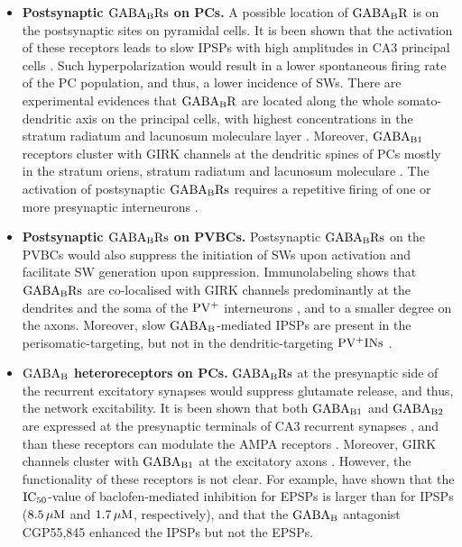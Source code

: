     \begin{itemize}
      \item \textbf{Postsynaptic $\rm GABA_BRs$ on PCs.}
        A possible location of $\rm GABA_BR$ is on the postsynaptic sites on
        pyramidal cells. It is been shown that the activation of these
        receptors leads to slow IPSPs with high amplitudes in CA3 principal
        cells \citep{Knowles1984}. Such hyperpolarization would result in a
        lower spontaneous firing rate of the PC population, and thus, a lower
        incidence of SWs. There are experimental evidences that $\rm GABA_BR$
        are located along the whole somato-dendritic axis on the principal
        cells, with highest concentrations in the stratum radiatum and
        lacunosum moleculare layer \citep{Degro2015}. Moreover, $\rm GABA_{B1}$
        receptors cluster with GIRK channels at the dendritic spines of PCs
        mostly in the stratum oriens, stratum radiatum and lacunosum moleculare
        \citep{Kulik2006}. The activation of postsynaptic $\rm GABA_BRs$
        requires a repetitive firing of one or more presynaptic interneurons
        \citep{Scanziani2000}.

      \item \textbf{Postsynaptic $\rm GABA_BRs$ on PVBCs.}
        Postsynaptic $\rm GABA_BRs$ on the PVBCs would also suppress the
        initiation of SWs upon activation and facilitate SW generation upon
        suppression. Immunolabeling shows that $\rm GABA_BRs$ are co-localised
        with GIRK channels predominantly at the dendrites and the soma of the
        $\rm PV^+$ interneurons \citep{Booker2013}, and to a smaller degree on
        the axons. Moreover, slow $\rm GABA_B$-mediated IPSPs are present in
        the perisomatic-targeting, but not in the dendritic-targeting $\rm
        PV^+INs$ \citep{Booker2013}.

      \item \textbf{$\rm GABA_B$ heteroreceptors on PCs.}
        $\rm GABA_BRs$ at the presynaptic side of the recurrent excitatory
        synapses would suppress glutamate release, and thus, the network
        excitability. It is been shown that both $\rm GABA_{B1}$ and $\rm
        GABA_{B2}$ are expressed at the presynaptic terminals of CA3 recurrent
        synapses \citep{Lopez2004}, and than these receptors can modulate the
        AMPA receptors \citep{Lei2003}. Moreover, GIRK channels cluster with
        $\rm GABA_{B1}$ at the excitatory axons \citep{Kulik2006}. However, the
        functionality of these receptors is not clear. For example,
        \cite{Lei2003} have shown that the $\rm IC_{50}$-value of
        baclofen-mediated inhibition for EPSPs is larger than for IPSPs ($8.5\,
        \rm \mu M$ and $1.7\, \rm \mu M$, respectively), and that the $\rm
        GABA_{B}$ antagonist CGP55,845 enhanced the IPSPs but not the EPSPs.


\end{itemize}
